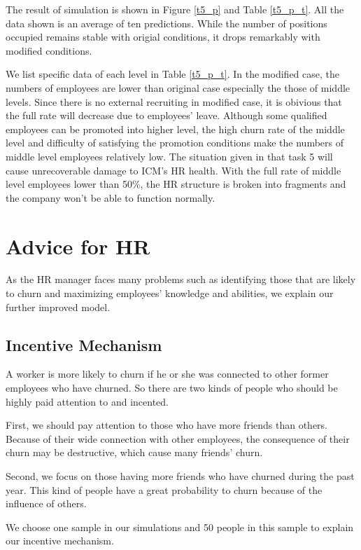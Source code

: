 \documentclass[12pt,a4paper,titlepage]{article}
\begin{document}
The result of simulation is shown in Figure \ref{t5_p} and Table
\ref{t5_p_t}. All the data shown is an average of ten
predictions. While the number of positions occupied remains stable
with origial conditions, it drops remarkably with modified
conditions.

We list specific data of each level in Table \ref{t5_p_t}. In the
modified case, the numbers of employees are lower than original case
especially the those of middle levels. Since there is no external
recruiting in modified case, it is obivious that the full rate will
decrease due to employees' leave. Although some qualified employees
can be promoted into higher level, the high churn rate of the middle
level and difficulty of satisfying the promotion conditions make the
numbers of middle level employees relatively low. The situation given
in that task 5 will cause unrecoverable damage to ICM's HR
health. With the full rate of middle level employees lower than 50\%,
the HR structure is broken into fragments and the company won't be
able to function normally.


\section{Advice for HR}
\label{sec:advice-for-hr}

As the HR manager faces many problems such as identifying those that
are likely to churn and maximizing employees' knowledge and
abilities, we explain our further improved model.

\subsection{Incentive Mechanism}
\label{sec:incentive-machanism}

A worker is more likely to churn if he or she was connected to other
former employees who have churned. So there are two kinds of people
who should be highly paid attention to and incented.

First, we should pay attention to those who have more friends than
others. Because of their wide connection with other employees, the
consequence of their churn may be destructive, which cause many
friends' churn.

Second, we focus on those having more friends who have churned
during the past year. This kind of people have a great probability to
churn because of the influence of others.

We choose one sample in our simulations and 50 people in this sample
to explain our incentive mechanism.
\end{document}
